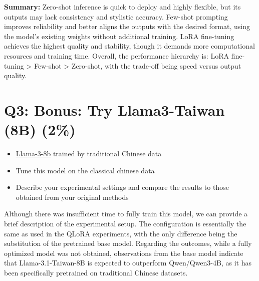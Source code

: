 \documentclass{article}
\begin{document}
\textbf{Summary:}
Zero-shot inference is quick to deploy and highly flexible, but its outputs may lack consistency and stylistic accuracy. Few-shot prompting improves reliability and better aligns the outputs with the desired format, using the model’s existing weights without additional training. LoRA fine-tuning achieves the highest quality and stability, though it demands more computational resources and training time. Overall, the performance hierarchy is: LoRA fine-tuning > Few-shot > Zero-shot, with the trade-off being speed versus output quality.

\section{Q3: Bonus: Try Llama3-Taiwan (8B) (2\%)}
\begin{itemize}
    \item \href{https://huggingface.co/yentinglin/Llama-3.1-Taiwan-8B}{Llama-3-8b} trained by traditional Chinese data
    \item Tune this model on the classical chinese data
    \item Describe your experimental settings and compare the results to those obtained from your original methods
\end{itemize}

Although there was insufficient time to fully train this model, we can provide a brief description of the experimental setup. The configuration is essentially the same as used in the QLoRA experiments, with the only difference being the substitution of the pretrained base model. Regarding the outcomes, while a fully optimized model was not obtained, observations from the base model indicate that Llama-3.1-Taiwan-8B is expected to outperform Qwen/Qwen3-4B, as it has been specifically pretrained on traditional Chinese datasets.



\end{document}
